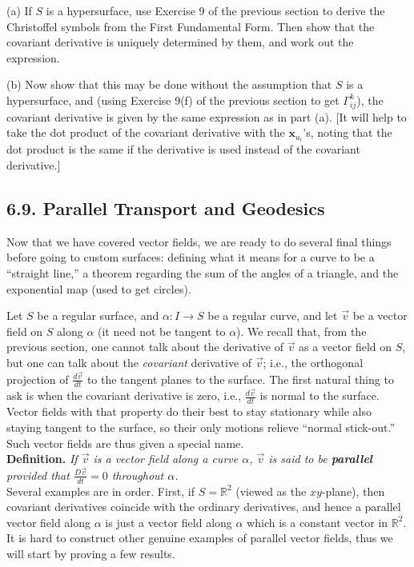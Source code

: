 \documentclass[leqno]{book}
\begin{document}
\begin{enumerate}
(a) If $S$ is a hypersurface, use Exercise 9 of the previous section to derive the Christoffel symbols from the First Fundamental Form.  Then show that the covariant derivative is uniquely determined by them, and work out the expression.

(b) Now show that this may be done without the assumption that $S$ is a hypersurface, and (using Exercise 9(f) of the previous section to get $\Gamma_{ij}^k$), the covariant derivative is given by the same expression as in part (a).  [It will help to take the dot product of the covariant derivative with the $\mathbf x_{u_i}$'s, noting that the dot product is the same if the derivative is used instead of the covariant derivative.]
\end{enumerate}

\subsection*{6.9. Parallel Transport and Geodesics}
Now that we have covered vector fields, we are ready to do several final things before going to custom surfaces: defining what it means for a curve to be a ``straight line,'' a theorem regarding the sum of the angles of a triangle, and the exponential map (used to get circles).

Let $S$ be a regular surface, and $\alpha:I\to S$ be a regular curve, and let $\vec v$ be a vector field on $S$ along $\alpha$ (it need not be tangent to $\alpha$).  We recall that, from the previous section, one cannot talk about the derivative of $\vec v$ as a vector field on $S$, but one can talk about the \emph{covariant} derivative of $\vec v$; i.e., the orthogonal projection of $\frac{d\vec v}{dt}$ to the tangent planes to the surface.  The first natural thing to ask is when the covariant derivative is zero, i.e., $\frac{d\vec v}{dt}$ is normal to the surface.  Vector fields with that property do their best to stay stationary while also staying tangent to the surface, so their only motions relieve ``normal stick-out.''  Such vector fields are thus given a special name.\\

\noindent\textbf{Definition.} \emph{If $\vec v$ is a vector field along a curve $\alpha$, $\vec v$ is said to be \textbf{parallel} provided that $\frac{D\vec v}{dt}=0$ throughout $\alpha$.}\\

\noindent Several examples are in order.  First, if $S=\mathbb R^2$ (viewed as the $xy$-plane), then covariant derivatives coincide with the ordinary derivatives, and hence a parallel vector field along $\alpha$ is just a vector field along $\alpha$ which is a constant vector in $\mathbb R^2$.  It is hard to construct other genuine examples of parallel vector fields, thus we will start by proving a few results.
\end{document}
